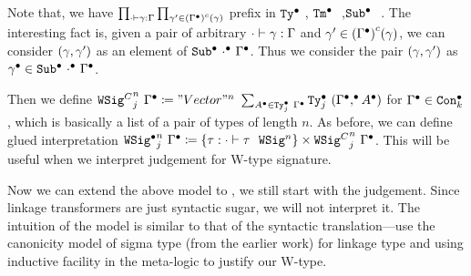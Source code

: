 Note that, we have $\prod_{ {\cdot} \vdash {\ensuremath{\gamma}} : {\Gamma} } \prod_{\gamma' \in {({\ensuremath{{\Gamma}^\bullet}})}^c(\gamma)}$ prefix in ${\texttt{Ty}}^\bullet_{}~{}$, ${\texttt{Tm}}^\bullet~{}~{}$,${\texttt{Sub}}^\bullet~{}~{}$. The interesting fact is, given a pair of arbitrary $ {\cdot} \vdash {\ensuremath{\gamma}} : {\Gamma} $ and $\gamma' \in {({\ensuremath{{\Gamma}^\bullet}})}^c(\gamma)$, we can consider $(\gamma, \gamma')$ as an element of ${\texttt{Sub}}^\bullet~{{\cdot}^\bullet}~{{\Gamma}^\bullet}$. Thus we consider the pair $(\gamma, \gamma')$ as ${\gamma}^\bullet \in {\texttt{Sub}}^\bullet~{{\cdot}^\bullet}~{{\Gamma}^\bullet}$.


Then we define ${\texttt{WSig}^C}_{j}^{n}~{{\Gamma}^\bullet} \coloneq "Vector"^n~\sum_{{A}^\bullet \in {\texttt{Ty}}^\bullet_{j}~{{\Gamma}^\bullet}} {\texttt{Ty}}^\bullet_{j}~{({{\Gamma}^\bullet},^\bullet{\ensuremath{{A}^\bullet}})}$ for ${\Gamma}^\bullet \in {\texttt{Con}}^\bullet_{k}$, which is basically a list of a pair of types of length $n$. As before, we can define glued interpretation ${{\texttt{WSig}}^\bullet}_{j}^{n}~{{\Gamma}^\bullet} \coloneq \{ \tau :  {\cdot} \vdash {\ensuremath{\tau}} \ \ \texttt{WSig}^{n}  \} \times {\texttt{WSig}^C}_{j}^{n}~{{\Gamma}^\bullet}$. This will be useful when we interpret judgement for W-type signature.


Now we can extend the above model to \TT , we still start with the judgement. Since linkage transformers are just syntactic sugar, we will not interpret it.
The intuition of the model is similar to that of the syntactic translation---use the canonicity model of sigma type (from the earlier work) for linkage type and using inductive facility in the meta-logic to justify our W-type. 

\newcommand{\CWmodel}{\ensuremath{\mathit{W}^C}}
\newcommand{\CWsup}{\ensuremath{\mathit{W^Csup}}}
\newcommand{\CWrec}{\ensuremath{\mathit{W^Crec}}}

